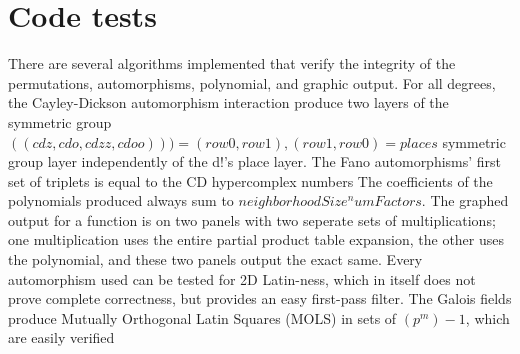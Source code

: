 \documentclass[11pt]{article}
\begin{document}
\section{Code tests}

There are several algorithms implemented that verify the integrity of the permutations, automorphisms, polynomial, and graphic output. For all degrees, the Cayley-Dickson automorphism interaction produce two layers of the symmetric group $((cdz,cdo,cdzz,cdoo))) = (row0,row1),(row1,row0) = places$ symmetric group layer independently of the d!'s place layer. The Fano automorphisms' first set of triplets is equal to the CD hypercomplex numbers The coefficients of the polynomials produced always sum to $neighborhoodSize^numFactors$. The graphed output for a function is on two panels with two seperate sets of multiplications; one multiplication uses the entire partial product table expansion, the other uses the polynomial, and these two panels output the exact same. Every automorphism used can be tested for 2D Latin-ness, which in itself does not prove complete correctness, but provides an easy first-pass filter. The Galois fields produce Mutually Orthogonal Latin Squares (MOLS) in sets of $(p^m)-1$, which are easily verified 
\end{document}
